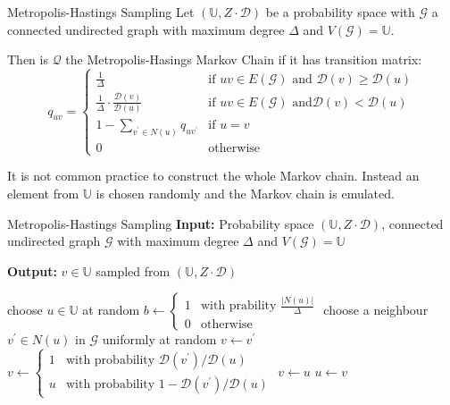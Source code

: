 \documentclass[english]{panikzettel}
\begin{document}
\begin{defi}{Metropolis-Hastings Sampling}
Let $(\mathbb{U}, Z \cdot \mathcal{D})$ be a probability space with $\mathcal{G}$ a connected undirected graph with maximum degree $\Delta$ and $V(\mathcal{G}) = \mathbb{U}$.

Then is $\mathcal{Q}$ the Metropolis-Hasings Markov Chain if it has transition matrix:
$$
q_{uv} =
\begin{cases}
\frac{1}{\Delta} & \text{if } uv \in E(\mathcal{G}) \text{ and } \mathcal{D}(v) \geq \mathcal{D}(u) \\
\frac{1}{\Delta} \cdot \frac{\mathcal{D}(v)}{\mathcal{D}(u)} & \text{if } uv \in E(\mathcal{G}) \text{  and} \mathcal{D}(v) < \mathcal{D}(u) \\
1 - \sum_{v^\prime \in N(u)} q_{uv^\prime} & \text{if } u = v \\
0 & \text{otherwise}
\end{cases}
$$
\end{defi}

It is not common practice to construct the whole Markov chain. Instead an element from $\mathbb{U}$ is chosen randomly and the Markov chain is emulated.

\begin{algo}{Metropolis-Hastings Sampling}
\textbf{Input:} Probability space $(\mathbb{U}, Z \cdot \mathcal{D})$, connected undirected graph $\mathcal{G}$ with maximum degree $\Delta$ and $V(\mathcal{G}) = \mathbb{U}$

\textbf{Output:} $v \in \mathbb{U}$ sampled from $(\mathbb{U}, Z \cdot \mathcal{D})$
\tcblower
\begin{algorithmic}[1]
\State choose $u \in \mathbb{U}$ at random
  \State $b \leftarrow \begin{cases}1 & \text{with prability } \frac{|N(u)|}{\Delta} \\ 0 & \text{otherwise} \end{cases}$
    \State choose a neighbour $v^\prime \in N(u)$ in $\mathcal{G}$ uniformly at random
      \State $v \leftarrow v^\prime$
    \Else
      \State $v \leftarrow \begin{cases}1 & \text{with probability } \mathcal{D}(v^\prime) / \mathcal{D}(u) \\ u & \text{with probability } 1 - \mathcal{D}(v^\prime) / \mathcal{D}(u) \end{cases}$
    \EndIf
  \Else
    \State $v \leftarrow u$
  \EndIf
  \State $u \leftarrow v$
\EndFor
\State {}
\end{algorithmic}
\end{algo}
\end{document}
